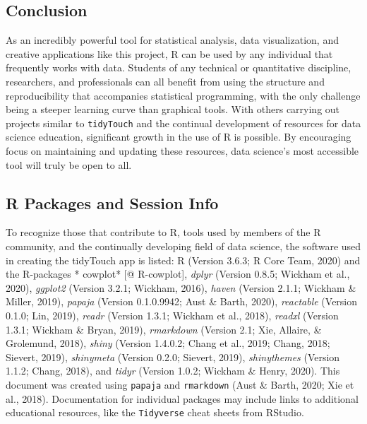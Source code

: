 \documentclass[english,man,floatsintext]{apa6}
\begin{document}
\hypertarget{conclusion}{%
\subsection{Conclusion}\label{conclusion}}

As an incredibly powerful tool for statistical analysis, data visualization, and creative applications like this project, R can be used by any individual that frequently works with data. Students of any technical or quantitative discipline, researchers, and professionals can all benefit from using the structure and reproducibility that accompanies statistical programming, with the only challenge being a steeper learning curve than graphical tools. With others carrying out projects similar to \texttt{tidyTouch} and the continual development of resources for data science education, significant growth in the use of R is possible. By encouraging focus on maintaining and updating these resources, data science's most accessible tool will truly be open to all.

\hypertarget{r-packages-and-session-info}{%
\subsection{R Packages and Session Info}\label{r-packages-and-session-info}}

To recognize those that contribute to R, tools used by members of the R community, and the continually developing field of data science, the software used in creating the tidyTouch app is listed: R (Version 3.6.3; R Core Team, 2020) and the R-packages * cowplot* {[}@ R-cowplot{]}, \emph{dplyr} (Version 0.8.5; Wickham et al., 2020), \emph{ggplot2} (Version 3.2.1; Wickham, 2016), \emph{haven} (Version 2.1.1; Wickham \& Miller, 2019), \emph{papaja} (Version 0.1.0.9942; Aust \& Barth, 2020), \emph{reactable} (Version 0.1.0; Lin, 2019), \emph{readr} (Version 1.3.1; Wickham et al., 2018), \emph{readxl} (Version 1.3.1; Wickham \& Bryan, 2019), \emph{rmarkdown} (Version 2.1; Xie, Allaire, \& Grolemund, 2018), \emph{shiny} (Version 1.4.0.2; Chang et al., 2019; Chang, 2018; Sievert, 2019), \emph{shinymeta} (Version 0.2.0; Sievert, 2019), \emph{shinythemes} (Version 1.1.2; Chang, 2018), and \emph{tidyr} (Version 1.0.2; Wickham \& Henry, 2020). This document was created using \texttt{papaja} and \texttt{rmarkdown} (Aust \& Barth, 2020; Xie et al., 2018). Documentation for individual packages may include links to additional educational resources, like the \texttt{Tidyverse} cheat sheets from RStudio.
\end{document}
